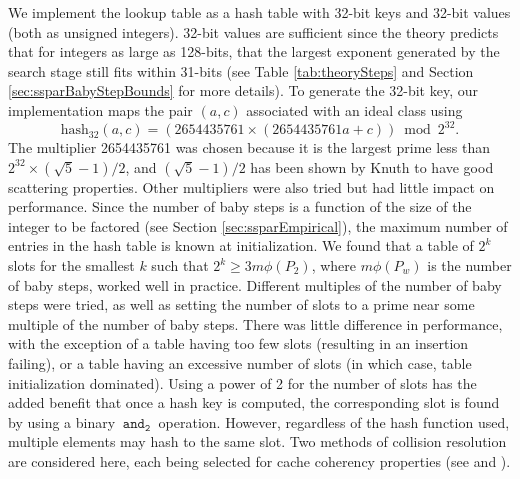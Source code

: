 \documentclass{ucalgthes1}
\theoremstyle{definition}
\newcommand{\band}{~\texttt{and}_\texttt{2}~}
\newcommand{\hash}{\textrm{hash}_{\textrm{32}}}
\begin{document}
We implement the lookup table as a hash table with 32-bit keys and 32-bit values (both as unsigned integers).  32-bit values are sufficient since the theory predicts that for integers as large as 128-bits, that the largest exponent generated by the search stage still fits within 31-bits (see Table \ref{tab:theorySteps} and Section \ref{sec:ssparBabyStepBounds} for more details).  To generate the 32-bit key, our implementation maps the pair $(a, c)$ associated with an ideal class using
\[
	\hash(a, c) = (2654435761 \times (2654435761a + c)) \bmod 2^{32}.
\]
The multiplier 2654435761 was chosen because it is the largest prime less than $2^{32} \times (\sqrt 5 - 1)/2$, and $(\sqrt 5 - 1)/2$ has been shown by Knuth \cite[Section~6.4]{Knuth1998} to have good scattering properties.  Other multipliers were also tried but had little impact on performance.  Since the number of baby steps is a function of the size of the integer to be factored (see Section \ref{sec:ssparEmpirical}), the maximum number of entries in the hash table is known at initialization.  We found that a table of $2^k$ slots for the smallest $k$ such that $2^k \ge 3m\phi(P_2)$, where $m\phi(P_w)$ is the number of baby steps, worked well in practice.  Different multiples of the number of baby steps were tried, as well as setting the number of slots to a prime near some multiple of the number of baby steps.  There was little difference in performance, with the exception of a table having too few slots (resulting in an insertion failing), or a table having an excessive number of slots (in which case, table initialization dominated).  Using a power of 2 for the number of slots has the added benefit that once a hash key is computed, the corresponding slot is found by using a binary $\band$ operation.  However, regardless of the hash function used, multiple elements may hash to the same slot.  Two methods of collision resolution are considered here, each being selected for cache coherency properties (see \cite[Subsection~11.2]{Cormen2001} and \cite{Kuchling2008}).
\end{document}
